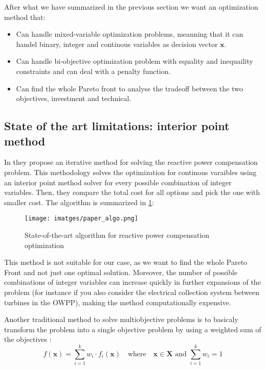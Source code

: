 \documentclass[a4paper,11pt, titlepage, twoside]{article}
\begin{document}
After what we have summarized in the previous section we want an optimization method that:
\begin{itemize}
    \item Can handle mixed-variable optimization problems, meanning that it can handel binary, integer and continous variables as decision vector $\mathbf{x}$.
    \item Can handle bi-objective optimization problem with equality and inequaility constraints and can deal with a penalty function.
    \item Can find the whole Pareto front to analyse the tradeoff between the two objectives, investment and technical.
\end{itemize}

\subsection{State of the art limitations: interior point method}

In \cite{paperbase} they propose an iterative method for solving the reactive power compensation problem. This methodology solves the optimization
for continous varaibles using an interior point method solver \cite{ipm} for every possible combination of integer variables. Then, they compare the total
cost for all options and pick the one with smaller cost. The algorithm is summarized in \ref{fig:paaperalgo}:

\begin{figure}[H]
    \centering
    \texttt{[image: imatges/paper\_algo.png]}
    \caption{State-of-the-art algorithm for reactive power compensation optimization \cite{paperbase}}
    \label{fig:paaperalgo}
\end{figure}
    


This method is not suitable for our case, as we want to find the whole Pareto Front and not just one optimal solution. Moreover, the number of possible combinations of integer variables
can increase quickly in further expansions of the problem (for instance if you also consider the electrical collection system between turbines in the OWPP), making the method computationally expensive.

Another traditional method to solve multiobjective problems is to basicaly transform the problem into a single objective problem by using a weighted sum of the objectives \cite{nsgai}:
\begin{equation}\label{weightedsum}
    f(\mathbf{x}) = \sum_{i=1}^{k} w_i \cdot f_i(\mathbf{x}) \quad \text{where} \quad \mathbf{x} \in \mathbf{X} \text{ and } \sum_{i=1}^{k} w_i = 1
\end{equation}
\end{document}
